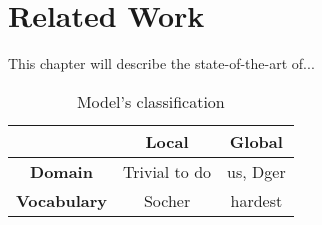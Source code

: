 \chapter{Related Work}

This chapter will describe the state-of-the-art of... 

\begin{table}[H]
	\centering
	\begin{tabular}{c|c|c|}
		\cline{2-3}
		& \textbf{Local} & \textbf{Global} \\ \hline
		\multicolumn{1}{|c|}{\textbf{Domain}}     & Trivial to do  & us, Dger        \\ \hline
		\multicolumn{1}{|c|}{\textbf{Vocabulary}} & Socher         & hardest         \\ \hline
	\end{tabular}
	\caption{Model's classification}
	\label{classification}
\end{table}
